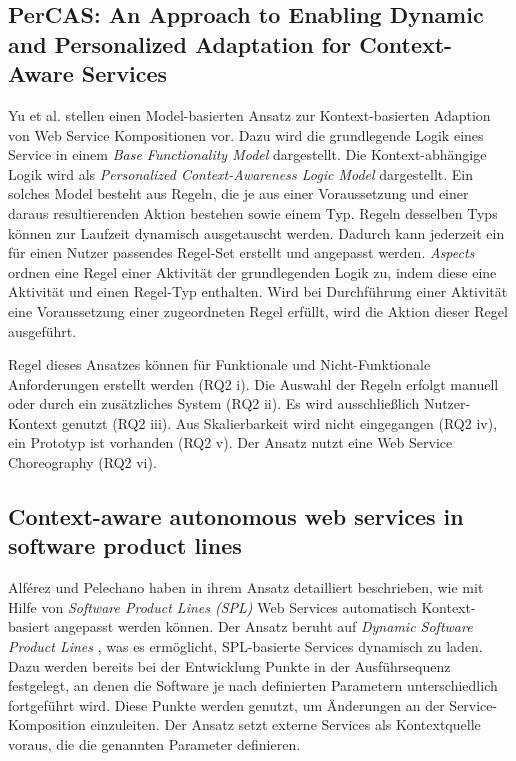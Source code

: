 \documentclass[conference,compsoc]{IEEEtran}
\begin{document}
\subsection{PerCAS: An Approach to Enabling Dynamic and Personalized Adaptation for Context-Aware Services}
Yu et al. \cite{YHS12} stellen einen Model-basierten Ansatz zur Kontext-basierten Adaption von Web Service Kompositionen vor. Dazu wird die grundlegende Logik eines Service in einem \textit{Base Functionality Model} dargestellt. Die Kontext-abhängige Logik wird als \textit{Personalized Context-Awareness Logic Model} dargestellt. Ein solches Model besteht aus Regeln, die je aus einer Voraussetzung und einer daraus resultierenden Aktion bestehen sowie einem Typ. Regeln desselben Typs können zur Laufzeit dynamisch ausgetauscht werden. Dadurch kann jederzeit ein für einen Nutzer passendes Regel-Set erstellt und angepasst werden. \textit{Aspects} ordnen eine Regel einer Aktivität der grundlegenden Logik zu, indem diese eine Aktivität und einen Regel-Typ enthalten. Wird bei Durchführung einer Aktivität eine Voraussetzung einer zugeordneten Regel erfüllt, wird die Aktion dieser Regel ausgeführt.

Regel dieses Ansatzes können für Funktionale und Nicht-Funktionale Anforderungen erstellt werden (RQ2 i). Die Auswahl der Regeln erfolgt manuell oder durch ein zusätzliches System (RQ2 ii). Es wird ausschließlich Nutzer-Kontext genutzt (RQ2 iii). Aus Skalierbarkeit wird nicht eingegangen (RQ2 iv), ein Prototyp ist vorhanden (RQ2 v). Der Ansatz nutzt eine Web Service Choreography (RQ2 vi).

\subsection{Context-aware autonomous web services in software product lines}
Alférez und Pelechano \cite{AP11} haben in ihrem Ansatz detailliert beschrieben, wie mit Hilfe von \textit{Software Product Lines (SPL)} Web Services automatisch Kontext-basiert angepasst werden können. Der Ansatz beruht auf \textit{Dynamic Software Product Lines} \cite{HHP08}, was es ermöglicht, SPL-basierte Services dynamisch zu laden. Dazu werden bereits bei der Entwicklung Punkte in der Ausführsequenz festgelegt, an denen die Software je nach definierten Parametern unterschiedlich fortgeführt wird. Diese Punkte werden genutzt, um Änderungen an der Service-Komposition einzuleiten. Der Ansatz setzt externe Services als Kontextquelle voraus, die die genannten Parameter definieren.
\end{document}
